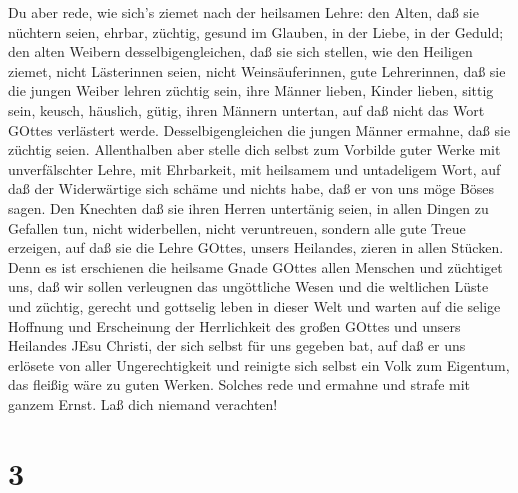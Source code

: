  Du aber rede, wie sich's ziemet nach der heilsamen Lehre:
 den Alten, daß sie nüchtern seien, ehrbar, züchtig, gesund
im Glauben, in der Liebe, in der Geduld;  den alten Weibern
desselbigengleichen, daß sie sich stellen, wie den Heiligen ziemet,
nicht Lästerinnen seien, nicht Weinsäuferinnen, gute Lehrerinnen,
 daß sie die jungen Weiber lehren züchtig sein, ihre Männer
lieben, Kinder lieben,  sittig sein, keusch, häuslich,
gütig, ihren Männern untertan, auf daß nicht das Wort GOttes verlästert
werde.  Desselbigengleichen die jungen Männer ermahne, daß
sie züchtig seien.  Allenthalben aber stelle dich selbst zum
Vorbilde guter Werke mit unverfälschter Lehre, mit Ehrbarkeit,
 mit heilsamem und untadeligem Wort, auf daß der
Widerwärtige sich schäme und nichts habe, daß er von uns möge Böses
sagen.  Den Knechten daß sie ihren Herren untertänig seien,
in allen Dingen zu Gefallen tun, nicht widerbellen,  nicht
veruntreuen, sondern alle gute Treue erzeigen, auf daß sie die Lehre
GOttes, unsers Heilandes, zieren in allen Stücken.  Denn es
ist erschienen die heilsame Gnade GOttes allen Menschen 
und züchtiget uns, daß wir sollen verleugnen das ungöttliche Wesen und
die weltlichen Lüste und züchtig, gerecht und gottselig leben in dieser
Welt  und warten auf die selige Hoffnung und Erscheinung
der Herrlichkeit des großen GOttes und unsers Heilandes JEsu Christi,
 der sich selbst für uns gegeben bat, auf daß er uns
erlösete von aller Ungerechtigkeit und reinigte sich selbst ein Volk zum
Eigentum, das fleißig wäre zu guten Werken.  Solches rede
und ermahne und strafe mit ganzem Ernst. Laß dich niemand verachten!

\hypertarget{section-2}{%
\section{3}\label{section-2}}

